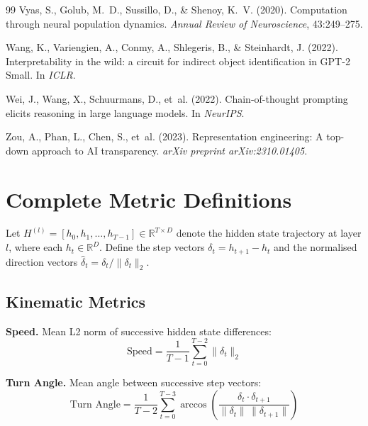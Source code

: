 \documentclass[11pt,twocolumn]{article}
\begin{document}
\begin{thebibliography}{99}
Vyas, S., Golub, M.~D., Sussillo, D., \& Shenoy, K.~V. (2020).
\newblock Computation through neural population dynamics.
\newblock \emph{Annual Review of Neuroscience}, 43:249--275.

Wang, K., Variengien, A., Conmy, A., Shlegeris, B., \& Steinhardt, J. (2022).
\newblock Interpretability in the wild: a circuit for indirect object identification in GPT-2 Small.
\newblock In \emph{ICLR}.

Wei, J., Wang, X., Schuurmans, D., et~al. (2022).
\newblock Chain-of-thought prompting elicits reasoning in large language models.
\newblock In \emph{NeurIPS}.

Zou, A., Phan, L., Chen, S., et~al. (2023).
\newblock Representation engineering: A top-down approach to AI transparency.
\newblock \emph{arXiv preprint arXiv:2310.01405}.

\end{thebibliography}


\appendix

\section{Complete Metric Definitions}
\label{app:metrics}

Let $H^{(l)} = [h_0, h_1, \ldots, h_{T-1}] \in \mathbb{R}^{T \times D}$ denote the hidden state trajectory at layer $l$, where each $h_t \in \mathbb{R}^D$. Define the step vectors $\delta_t = h_{t+1} - h_t$ and the normalised direction vectors $\hat{\delta}_t = \delta_t / \|\delta_t\|_2$.

\subsection{Kinematic Metrics}

\textbf{Speed.} Mean L2 norm of successive hidden state differences:
\begin{equation}
\text{Speed} = \frac{1}{T-1} \sum_{t=0}^{T-2} \|\delta_t\|_2
\end{equation}

\textbf{Turn Angle.} Mean angle between successive step vectors:
\begin{equation}
\text{Turn Angle} = \frac{1}{T-2} \sum_{t=0}^{T-3} \arccos\left(\frac{\delta_t \cdot \delta_{t+1}}{\|\delta_t\| \, \|\delta_{t+1}\|}\right)
\end{equation}
\end{document}
